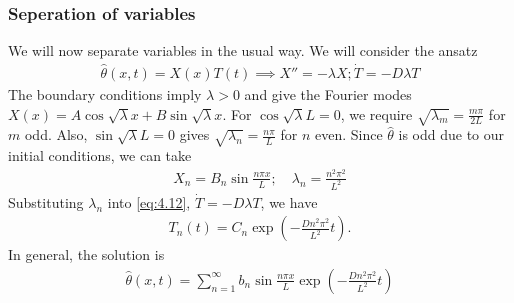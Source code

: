\subsubsection{Seperation of variables}
We will now separate variables in the usual way.
We will consider the ansatz
\begin{align} \label{eq:4.12}
	\hat \theta(x,t) = X(x) T(t) \implies X'' = - \lambda X; \dot T = -D \lambda T
\end{align}
The boundary conditions imply $\lambda > 0$ and give the Fourier modes $X(x) = A \cos \sqrt{\lambda} x + B \sin \sqrt{\lambda} x$.
For $\cos \sqrt{\lambda} L = 0$, we require $\sqrt{\lambda_m} = \frac{m \pi}{2L}$ for $m$ odd.
Also, $\sin \sqrt{\lambda} L = 0$ gives $\sqrt{\lambda_n} = \frac{n \pi}{L}$ for $n$ even.
Since $\hat \theta$ is odd due to our initial conditions, we can take
\begin{align*}
	X_n = B_n \sin \frac{n \pi x}{L}; \quad \lambda_n = \frac{n^2 \pi^2}{L^2}
\end{align*}
Substituting $\lambda_n$ into \cref{eq:4.12}, $\dot T = -D \lambda T$, we have
\begin{align*}
	T_n(t) = C_n \exp(-\frac{Dn^2 \pi^2}{L^2} t ).
\end{align*}
In general, the solution is
\begin{align} \label{eq:4.13}
	\hat \theta(x,t) = \sum_{n=1}^\infty b_n \sin \frac{n \pi x}{L} \exp(-\frac{Dn^2 \pi^2}{L^2} t )
\end{align}

